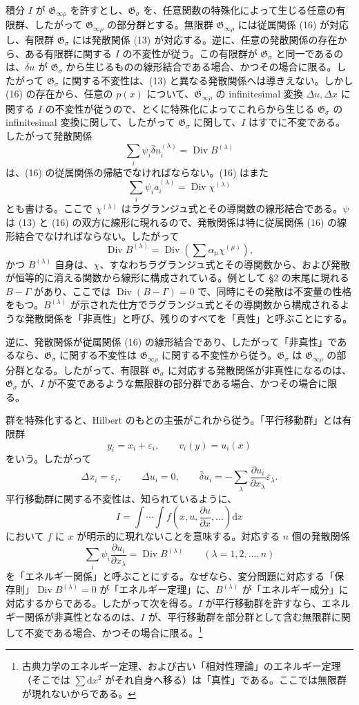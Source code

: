 \documentclass[11pt]{article}
\newcommand{\D}{\Delta}
\newcommand{\eps}{\varepsilon}
\providecommand{\dd}{\mathrm d}
\providecommand{\Div}{\operatorname{Div}}
\providecommand{\G}{\mathfrak G}
\providecommand{\bd}{\bar{\delta}}
\providecommand{\p}{\partial}
\begin{document}
積分 \(I\) が \(\G_{\infty\rho}\) を許すとし、\(\G_\sigma\) を、任意関数の特殊化によって生じる任意の有限群、したがって \(\G_{\infty\rho}\) の部分群とする。無限群 \(\G_{\infty\rho}\) には従属関係 (16) が対応し、有限群 \(\G_\sigma\) には発散関係 (13) が対応する。逆に、任意の発散関係の存在から、ある有限群に関する \(I\) の不変性が従う。この有限群が \(\G_\sigma\) と同一であるのは、\(\bd u\) が \(\G_\sigma\) から生じるものの線形結合である場合、かつその場合に限る。したがって \(\G_\sigma\) に関する不変性は、(13) と異なる発散関係へは導きえない。しかし (16) の存在から、任意の \(p(x)\) について、\(\G_{\infty\rho}\) の infinitesimal 変換 \(\D u,\D x\) に関する \(I\) の不変性が従うので、とくに特殊化によってこれらから生じる \(\G_\sigma\) の infinitesimal 変換に関して、したがって \(\G_\sigma\) に関して、\(I\) はすでに不変である。したがって発散関係
\[
\sum_i\psi_i\bd u_i^{(\lambda)}=\Div B^{(\lambda)}
\]
は、(16) の従属関係の帰結でなければならない。(16) はまた
\[
\sum_i\psi_i a_i^{(\lambda)}=\Div\chi^{(\lambda)}
\]
とも書ける。ここで \(\chi^{(\lambda)}\) はラグランジュ式とその導関数の線形結合である。\(\psi\) は (13) と (16) の双方に線形に現れるので、発散関係は特に従属関係 (16) の線形結合でなければならない。したがって
\[
\Div B^{(\lambda)}=\Div\left(\sum \alpha_\mu\chi^{(\mu)}\right),
\]
かつ \(B^{(\lambda)}\) 自身は、\(\chi\)、すなわちラグランジュ式とその導関数から、および発散が恒等的に消える関数から線形に構成されている。例として \S{}2 の末尾に現れる \(B-\Gamma\) があり、ここでは \(\Div(B-\Gamma)=0\) で、同時にその発散は不変量の性格をもつ。\(B^{(\lambda)}\) が示された仕方でラグランジュ式とその導関数から構成されるような発散関係を「非真性」と呼び、残りのすべてを「真性」と呼ぶことにする。

逆に、発散関係が従属関係 (16) の線形結合であり、したがって「非真性」であるなら、\(\G_\sigma\) に関する不変性は \(\G_{\infty\rho}\) に関する不変性から従う。\(\G_\sigma\) は \(\G_{\infty\rho}\) の部分群となる。したがって、有限群 \(\G_\sigma\) に対応する発散関係が非真性になるのは、\(\G_\sigma\) が、\(I\) が不変であるような無限群の部分群である場合、かつその場合に限る。

群を特殊化すると、Hilbert のもとの主張がこれから従う。「平行移動群」とは有限群
\[
y_i=x_i+\eps_i,\qquad v_i(y)=u_i(x)
\]
をいう。したがって
\[
\D x_i=\eps_i,\qquad \D u_i=0,\qquad
\bd u_i=-\sum_\lambda\frac{\p u_i}{\p x_\lambda}\eps_\lambda.
\]
平行移動群に関する不変性は、知られているように、
\[
I=\int\!\cdots\!\int f\!\left(x,u,\frac{\p u}{\p x},\ldots\right)\dd x
\]
において \(f\) に \(x\) が明示的に現れないことを意味する。対応する \(n\) 個の発散関係
\[
\sum_i\psi_i\frac{\p u_i}{\p x_\lambda}=\Div B^{(\lambda)}
\qquad(\lambda=1,2,\ldots,n)
\]
を「エネルギー関係」と呼ぶことにする。なぜなら、変分問題に対応する「保存則」\(\Div B^{(\lambda)}=0\) が「エネルギー定理」に、\(B^{(\lambda)}\) が「エネルギー成分」に対応するからである。したがって次を得る。\(I\) が平行移動群を許すなら、エネルギー関係が非真性となるのは、\(I\) が、平行移動群を部分群として含む無限群に関して不変である場合、かつその場合に限る。\footnote{古典力学のエネルギー定理、および古い「相対性理論」のエネルギー定理（そこでは \(\sum \dd x^2\) がそれ自身へ移る）は「真性」である。ここでは無限群が現れないからである。}
\end{document}
